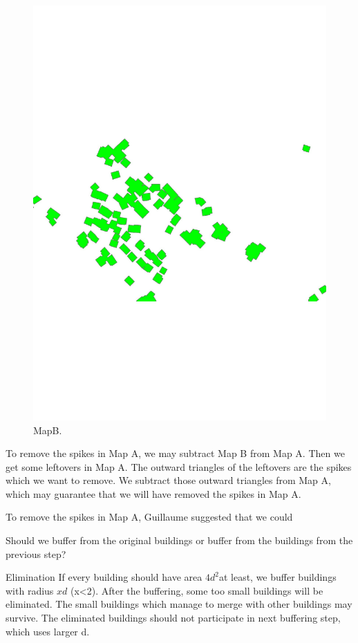 \documentclass[graybox]{svmult}
\begin{document}
\begin{figure}[tb]
	\centering
	\includegraphics[width=\linewidth]{MapB}
	\caption{MapB.}
	\label{fig:MapB}
\end{figure}

To remove the spikes in Map A, we may subtract Map B from Map A. 
Then we get some leftovers in Map A. The outward triangles of 
the leftovers are the spikes which we want to remove. We 
subtract those outward triangles from Map A, which may guarantee 
that we will have removed the spikes in Map A.

To remove the spikes in Map A, Guillaume suggested that we could 

Should we buffer from the original buildings or buffer from the 
buildings from the previous step?


Elimination
If every building should have area $4d^2$at least, we buffer 
buildings with radius $xd$ (x<2). After the buffering, some too 
small buildings will be eliminated. The small buildings which 
manage to merge with other buildings may survive. The eliminated 
buildings should not participate in next buffering step, which 
uses larger d.
\end{document}
